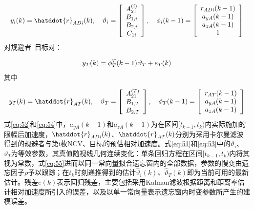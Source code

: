 \begin{equation}
\label{eq:52}
{y_i}(k) = \hatddot{r}_{ADi}(k),\quad {\vartheta _i} = \left[ {\begin{array}{*{20}{c}}
  {A_{21}^{(i)}} \\ 
  {{B_{1,i}}} \\ 
  {{B_{2,i}}} \\ 
  {{C_{1i}}} 
\end{array}} \right],\quad {\phi _i}(k - 1) = \left[ {\begin{array}{*{20}{c}}
  {{r_{ADi}}(k - 1)} \\ 
  {{a_{yA}}(k - 1)} \\ 
  {{a_{zA}}(k - 1)} \\ 
  1 
\end{array}} \right]
\end{equation}
对规避者–目标对：

\begin{equation}
\label{eq:53}
{y_T}(k) = \phi _T^T(k - 1){\kern 1pt} {\vartheta _T} + {e_T}(k)
\end{equation}
其中

\begin{equation}
\label{eq:54}
{y_T}(k) = \hatddot{r}_{AT}(k),\quad {\vartheta _T} = \left[ {\begin{array}{*{20}{c}}
  {A_{21}^{(T)}} \\ 
  {{B_{1,T}}} \\ 
  {{B_{2,T}}} 
\end{array}} \right],\quad {\phi _T}(k - 1) = \left[ {\begin{array}{*{20}{c}}
  {{r_{AT}}(k - 1)} \\ 
  {{a_{yA}}(k - 1)} \\ 
  {{a_{zA}}(k - 1)} 
\end{array}} \right]
\end{equation}
式\eqref{eq:52}和\eqref{eq:54}中，${a_{yA}}(k - 1)$和${a_{zA}}(k - 1)$为在区间$[{t_{k - 1}},{t_k})$内实际施加的限幅后加速度，$\hatddot{r}_{ADi}(k)$、$\hatddot{r}_{AT}(k)$分别为采用卡尔曼滤波得到的规避者与第i枚NCV、目标的预估相对加速度。式\eqref{eq:51}和\eqref{eq:53}中的${\vartheta _i}$、${\vartheta _T}$为等效参数，其真值随视线几何连续变化：单条回归方程在区间$[{t_{k - 1}},{t_k})$内将其视为常数，式\eqref{eq:55}进而以同一常向量拟合遗忘窗内的全部数据，参数的慢变由遗忘因子$\rho $予以跟踪；在${t_k}$时刻递推得到的估计$\hat{\vartheta}_{i}(k)$、$\hat{\vartheta}_{T}(k)$即为当前可用的最新估计。残差$e(k)$表示回归残差，主要包括采用Kalman滤波根据距离和距离率估计相对加速度所引入的误差，以及以单一常向量表示遗忘窗内时变参数所产生的建模误差。

